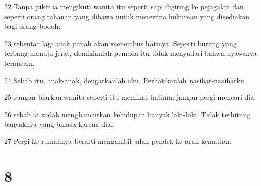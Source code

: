 \par 22 Tanpa pikir ia mengikuti wanita itu seperti sapi digiring ke pejagalan dan seperti orang tahanan yang dibawa untuk menerima hukuman yang disediakan bagi orang bodoh;
\par 23 sebentar lagi anak panah akan menembus hatinya. Seperti burung yang terbang menuju jerat, demikianlah pemuda itu tidak menyadari bahwa nyawanya terancam.
\par 24 Sebab itu, anak-anak, dengarkanlah aku. Perhatikanlah nasihat-nasihatku.
\par 25 Jangan biarkan wanita seperti itu memikat hatimu; jangan pergi mencari dia,
\par 26 sebab ia sudah menghancurkan kehidupan banyak laki-laki. Tidak terhitung banyaknya yang binasa karena dia.
\par 27 Pergi ke rumahnya berarti mengambil jalan pendek ke arah kematian.

\chapter{8}

